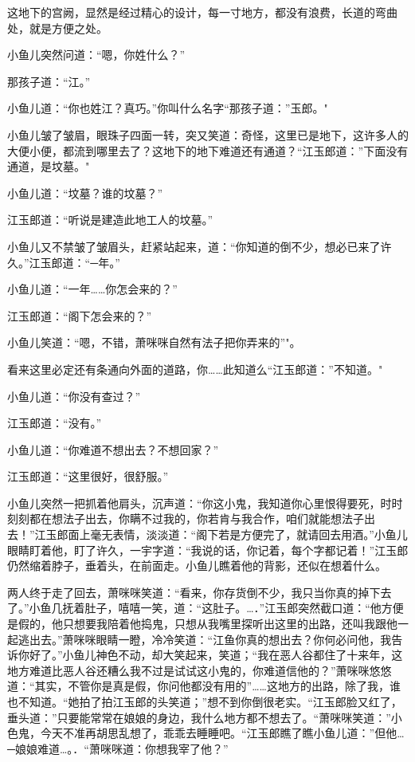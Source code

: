 \documentclass[12pt,oneside]{book}
\begin{document}
这地下的宫阙，显然是经过精心的设计，每一寸地方，都没有浪费，长道的弯曲处，就是方便之处。

小鱼儿突然问道：``嗯，你姓什么？''

那孩子道：``江。''

小鱼儿道：``你也姓江？真巧。''你叫什么名字``那孩子道：''玉郎。"

小鱼儿皱了皱眉，眼珠子四面一转，突又笑道：奇怪，这里已是地下，这许多人的大便小便，都流到哪里去了？这地下的地下难道还有通道？``江玉郎道：''下面没有通道，是坟墓。"

小鱼儿道：``坟墓？谁的坟墓？''

江玉郎道：``听说是建造此地工人的坟墓。''

小鱼儿又不禁皱了皱眉头，赶紧站起来，道：``你知道的倒不少，想必已来了许久。''江玉郎道：``─年。''

小鱼儿道：``一年\ldots\ldots 你怎会来的？''

江玉郎道：``阁下怎会来的？''

小鱼儿笑道：``嗯，不错，萧咪咪自然有法子把你弄来的''"。

看来这里必定还有条通向外面的道路，你\ldots\ldots 此知道么``江玉郎道：''不知道。"

小鱼儿道：``你没有查过？''

江玉郎道：``没有。''

小鱼儿道：``你难道不想出去？不想回家？''

江玉郎道：``这里很好，很舒服。''

小鱼儿突然一把抓着他肩头，沉声道：``你这小鬼，我知道你心里恨得要死，时时刻刻都在想法子出去，你瞒不过我的，你若肯与我合作，咱们就能想法子出去！''江玉郎面上毫无表情，淡淡道：``阁下若是方便完了，就请回去用酒。''小鱼儿眼睛盯着他，盯了许久，一宇字道：``我说的话，你记着，每个字都记着！''江玉郎仍然缩着脖子，垂着头，在前面走。小鱼儿瞧着他的背影，还似在想着什么。

两人终于走了回去，萧咪咪笑道：``看来，你存货倒不少，我只当你真的掉下去了。''小鱼几抚着肚子，嘻嘻一笑，道：``这肚子。\ldots．''江玉郎突然截口道：``他方便是假的，他只想要我陪着他捣鬼，只想从我嘴里探听出这里的出路，还叫我跟他一起逃出去。''萧咪咪眼睛一瞪，冷冷笑道：``江鱼你真的想出去？你何必问他，我告诉你好了。''小鱼儿神色不动，却大笑起来，笑道；``我在恶人谷都住了十来年，这地方难道比恶人谷还糟么我不过是试试这小鬼的，你难道信他的？''萧咪咪悠悠道：``其实，不管你是真是假，你问他都没有用的''\ldots\ldots 这地方的出路，除了我，谁也不知道。``她拍了拍江玉郎的头笑道；''想不到你倒很老实。``江玉郎脸又红了，垂头道：''只要能常常在娘娘的身边，我什么地方都不想去了。``萧咪咪笑道：''小色鬼，今天不准再胡思乱想了，乖乖去睡睡吧。``江玉郎瞧了瞧小鱼儿道：''但他\ldots─娘娘难道\ldots。．``萧咪咪道：你想我宰了他？''
\end{document}
